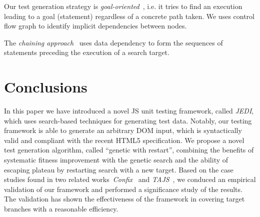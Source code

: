 \documentclass[sigconf,review]{acmart}
\begin{document}
Our test generation strategy is \emph{goal-oriented}~\cite{korel1992dynamic}, i.e. it tries to find an execution leading to a goal (statement) regardless of a concrete path taken. We uses control flow graph to identify implicit dependencies between nodes. 

The \emph{chaining approach}~\cite{ferguson1996chaining} uses data dependency to form the sequences of statements preceding the execution of a search target. 



\section{Conclusions}
\label{sec:concl}

In this paper we have introduced a novel JS unit testing framework, called \emph{JEDI}, which uses search-based techniques for generating test data. Notably, our testing framework is able to generate an arbitrary DOM input, which is syntactically valid and compliant with the recent HTML5 specification. We propose a novel test generation algorithm, called ``genetic with restart'', combining the benefits of systematic fitness improvement with the genetic search and the ability of escaping plateau by restarting search with a new target. Based on the case studies found in two related works~\emph{Confix}~\cite{amin:ase15} and \emph{TAJS}~\cite{dom2011}, we conduced an empirical validation of our framework and performed a significance study of the results. The validation has shown the effectiveness of the framework in covering target branches with a reasonable efficiency.


 
\end{document}
